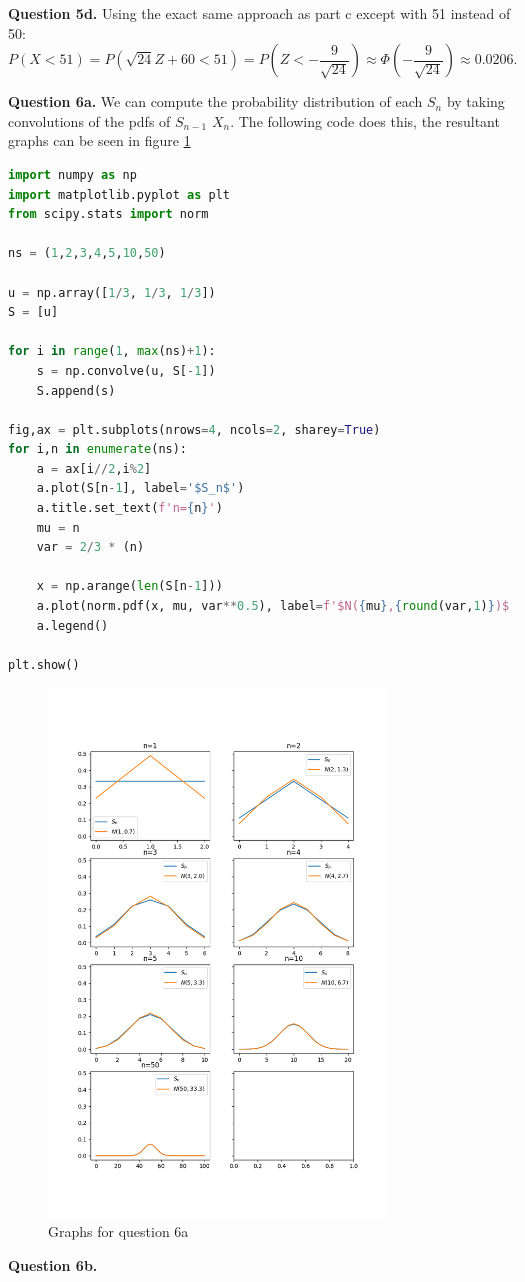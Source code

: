 \documentclass[letterpaper, reqno,11pt]{article}
\begin{document}
{\medskip\noindent\bf Question 5d.} Using the exact same approach as part c except with 51 instead of 50: 
\[
P(X< 51)= P(\sqrt{24} Z+60< 51)=P(Z<-\frac{9}{\sqrt{24} })\approx \Phi(-\frac{9}{\sqrt{24} })\approx 0.0206
.\]

{\medskip\noindent\bf Question 6a.} We can compute the probability distribution of each $S_n$ by taking convolutions of the pdfs of $S_{n-1}$ $X_n$. The following code does this, the resultant graphs can be seen in figure \ref{fig:6a}

\begin{lstlisting}[language=Python]
import numpy as np
import matplotlib.pyplot as plt
from scipy.stats import norm

ns = (1,2,3,4,5,10,50)

u = np.array([1/3, 1/3, 1/3])
S = [u]

for i in range(1, max(ns)+1):
    s = np.convolve(u, S[-1])
    S.append(s)

fig,ax = plt.subplots(nrows=4, ncols=2, sharey=True)
for i,n in enumerate(ns):
    a = ax[i//2,i%2]
    a.plot(S[n-1], label='$S_n$')
    a.title.set_text(f'n={n}')
    mu = n
    var = 2/3 * (n)
    
    x = np.arange(len(S[n-1]))
    a.plot(norm.pdf(x, mu, var**0.5), label=f'$N({mu},{round(var,1)})$')
    a.legend()

plt.show()
\end{lstlisting}

\begin{figure}[htpb]
    \centering
    \includegraphics[width=0.8\textwidth]{6a}
    \caption{Graphs for question 6a}
    \label{fig:6a}
\end{figure}

{\medskip\noindent\bf Question 6b.} 
\end{document}
